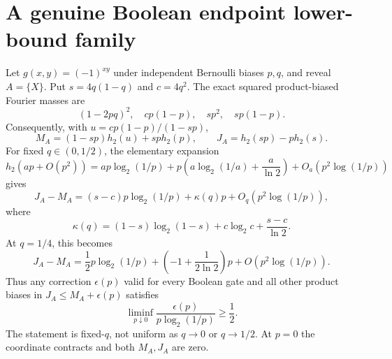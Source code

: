 \section*{A genuine Boolean endpoint lower-bound family}
Let $g(x,y)=(-1)^{xy}$ under independent Bernoulli biases $p,q$, and reveal
$A=\{X\}$.  Put $s=4q(1-q)$ and $c=4q^2$.  The exact squared product-biased
Fourier masses are
\[
 (1-2pq)^2,\quad cp(1-p),\quad sp^2,\quad sp(1-p).
\]
Consequently, with $u=cp(1-p)/(1-sp)$,
\[
 M_A=(1-sp)h_2(u)+sp h_2(p),\qquad
 J_A=h_2(sp)-p h_2(s).
\]
For fixed $q\in(0,1/2)$, the elementary expansion
\[
 h_2(ap+O(p^2))=ap\log_2(1/p)
 +p\left(a\log_2(1/a)+\frac a{\ln2}\right)
 +O_a(p^2\log(1/p))
\]
gives
\[
 J_A-M_A=(s-c)p\log_2(1/p)+\kappa(q)p
 +O_q(p^2\log(1/p)),
\]
where
\[
 \kappa(q)=(1-s)\log_2(1-s)+c\log_2c+\frac{s-c}{\ln2}.
\]
At $q=1/4$, this becomes
\[
 J_A-M_A=\frac12p\log_2(1/p)
 +\left(-1+\frac1{2\ln2}\right)p
 +O(p^2\log(1/p)).
\]
Thus any correction $\epsilon(p)$ valid for every Boolean gate and all other
product biases in $J_A\le M_A+\epsilon(p)$ satisfies
\[
 \liminf_{p\downarrow0}\frac{\epsilon(p)}{p\log_2(1/p)}\ge\frac12.
\]
The statement is fixed-$q$, not uniform as $q\to0$ or $q\to1/2$.  At $p=0$
the coordinate contracts and both $M_A,J_A$ are zero.
